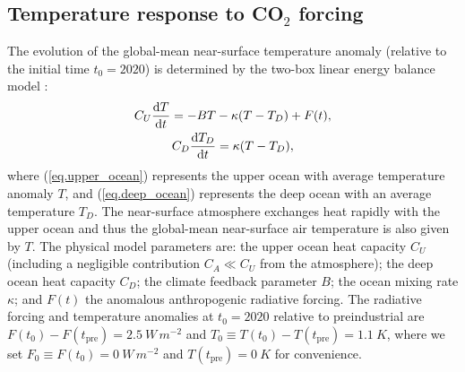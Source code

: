 \documentclass{article}
\begin{document}
\subsection{Temperature response to CO$_{2}$ forcing}
The evolution of the global-mean near-surface temperature anomaly (relative to the initial time $t_{0} = 2020$) is determined by the two-box linear energy balance model \citep[e.g][]{gregory_vertical_2000, held_probing_2010}:
\begin{gather}
    C_{U} \dv{T}{t} = -B T - \kappa( T - T_{D}) + F(t), \label{eq.upper_ocean}
    \\
    C_{D} \dv{T_{D}}{t} = \kappa (T - T_{D}),\label{eq.deep_ocean}
\end{gather}
where (\ref{eq.upper_ocean}) represents the upper ocean with average temperature anomaly $T$, and (\ref{eq.deep_ocean}) represents the deep ocean with an average temperature $T_{D}$. The near-surface atmosphere exchanges heat rapidly with the upper ocean and thus the global-mean near-surface air temperature is also given by $T$. The physical model parameters are: the upper ocean heat capacity $C_{U}$ (including a negligible contribution $C_{A} \ll C_{U}$ from the atmosphere); the deep ocean heat capacity $C_{D}$; the climate feedback parameter $B$; the ocean mixing rate $\kappa$; and $F(t)$ the anomalous anthropogenic radiative forcing. The radiative forcing and temperature anomalies at $t_{0} = 2020$ relative to preindustrial are $F(t_{0}) - F(t_{\text{pre}}) = \SI{2.5}{W\, m^{-2}}$ and $T_{0} \equiv T(t_{0}) - T(t_{\text{pre}}) = \SI{1.1}{K}$, where we set $F_{0} \equiv F(t_{0}) = \SI{0}{W\, m^{-2}}$ and $T(t_{\text{pre}}) = \SI{0}{K}$ for convenience.
\end{document}
